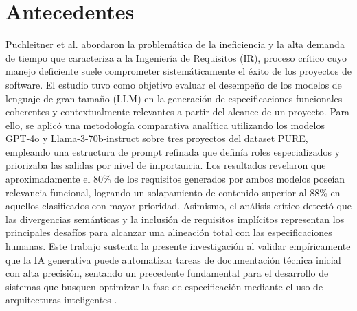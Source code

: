 
\section{Antecedentes}
Puchleitner et al. \cite{Puchleitner2026} abordaron la problemática de la ineficiencia y la alta demanda de tiempo que caracteriza a la Ingeniería de 
Requisitos (IR), proceso crítico cuyo manejo deficiente suele comprometer sistemáticamente el éxito de los proyectos de software. El estudio tuvo como 
objetivo evaluar el desempeño de los modelos de lenguaje de gran tamaño (LLM) en la generación de especificaciones funcionales coherentes y 
contextualmente relevantes a partir del alcance de un proyecto. Para ello, se aplicó una metodología comparativa analítica utilizando los modelos 
GPT-4o y Llama-3-70b-instruct sobre tres proyectos del dataset PURE, empleando una estructura de prompt refinada que definía roles especializados y 
priorizaba las salidas por nivel de importancia. Los resultados revelaron que aproximadamente el 80\% de los requisitos generados por ambos modelos 
poseían relevancia funcional, logrando un solapamiento de contenido superior al 88\% en aquellos clasificados con mayor prioridad. Asimismo, el análisis 
crítico detectó que las divergencias semánticas y la inclusión de requisitos implícitos representan los principales desafíos para alcanzar una alineación 
total con las especificaciones humanas. Este trabajo sustenta la presente investigación al validar empíricamente que la IA generativa puede automatizar 
tareas de documentación técnica inicial con alta precisión, sentando un precedente fundamental para el desarrollo de sistemas que busquen optimizar la 
fase de especificación mediante el uso de arquitecturas inteligentes \cite{Puchleitner2026}.


